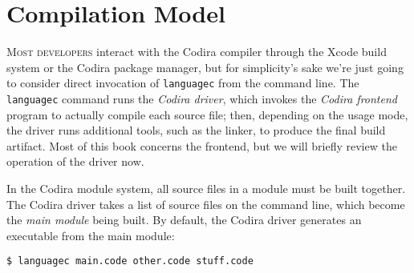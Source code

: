 \documentclass[../generics]{subfiles}
\begin{document}
\chapter{Compilation Model}\label{compilation model}

\lettrine{M}{ost developers} interact with the Codira compiler through the Xcode build system or the Codira package manager, but for simplicity's sake we're just going to consider direct invocation of \texttt{languagec} from the command line. The \texttt{languagec} command runs the \emph{Codira driver}, which invokes the \emph{Codira frontend} program to actually compile each source file; then, depending on the usage mode, the driver runs additional tools, such as the linker, to produce the final build artifact. Most of this book concerns the frontend, but we will briefly review the operation of the driver now.

In the Codira module system, all source files in a module must be built together. The Codira driver takes a list of source files on the command line, which become the \emph{main module} being built. By default, the Codira driver generates an executable from the main module:
\begin{Verbatim}
$ languagec main.code other.code stuff.code
\end{Verbatim}
\end{document}
